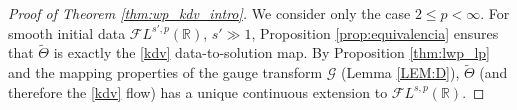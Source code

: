 \documentclass[%
11pt,  reqno]{amsart}
\makeatletter
\newcommand{\5}{\textup{V}}
\newcommand{\noi}{\noindent}
\newcommand{\FL}{\mathcal{F} L}
\newcommand{\dl}{\delta}
\newcommand{\dx}{\partial_x}
\theoremstyle{remark}
\DeclareMathOperator*{\supp}{supp}
\newcommand{\R}{\mathbb{R}}
\newcommand{\TT}{\mathcal{T}}
\newcommand{\Tr}{\mathrm{T}}
\renewcommand{\l}{\ell}
\def\<#1>{\csname MH@symb@#1\endcsname}
\newcommand{\Gc}{\mathcal{G}}
\numberwithin{equation}{section}
\numberwithin{theorem}{section}
\newcommand{\Ncal}{\mathcal{N}}
\newcommand{\andreia}[1]{\marginpar{\color{purple} $\Leftarrow\Leftarrow\Leftarrow$}{\smallskip \noi\color{purple}ANDREIA: #1}\smallskip}
\makeatother
\begin{document}
\begin{proof}[Proof of Theorem \ref{thm:wp_kdv_intro}] We consider only the case $2\le p<\infty$. For smooth initial data $\FL^{s',p}(\R)$, $s'\gg 1$,  Proposition \ref{prop:equivalencia} ensures that $\tilde{\Theta}$ is exactly the \eqref{kdv} data-to-solution map. By Proposition \ref{thm:lwp_lp} and the mapping properties of the gauge transform $\Gc$ (Lemma \ref{LEM:D}), $\tilde{\Theta}$ (and therefore the \eqref{kdv} flow) has a unique continuous extension to $\FL^{s,p}(\R)$.
\end{proof}


\end{document}
